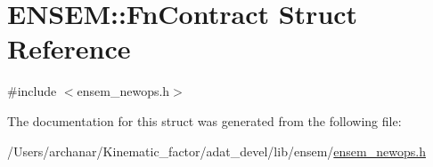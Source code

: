 \hypertarget{structENSEM_1_1FnContract}{}\section{E\+N\+S\+EM\+:\+:Fn\+Contract Struct Reference}
\label{structENSEM_1_1FnContract}


{\ttfamily \#include $<$ensem\+\_\+newops.\+h$>$}



The documentation for this struct was generated from the following file\+:\begin{DoxyCompactItemize}
\item 
/\+Users/archanar/\+Kinematic\+\_\+factor/adat\+\_\+devel/lib/ensem/\mbox{\hyperlink{lib_2ensem_2ensem__newops_8h}{ensem\+\_\+newops.\+h}}\end{DoxyCompactItemize}
